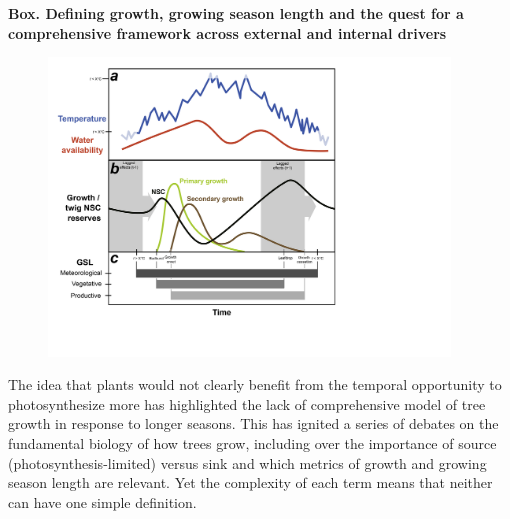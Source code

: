 \documentclass[11pt]{article}
\begin{document}
\newpage
{\bf Box. Defining growth, growing season length and the quest for a comprehensive framework across external and internal drivers}
\begin{figure}[h!]
\includegraphics[width=0.95\textwidth]{..//figures/gslconcept/NEW_FI~1_ac_ver2.png}
\label{fig:defineGSLgrowth}
\end{figure}

The idea that plants would not clearly benefit from the temporal opportunity to photosynthesize more has highlighted the lack of comprehensive model of tree growth in response to longer seasons. This has ignited a series of debates on the fundamental biology of how trees grow, including over the importance of source (photosynthesis-limited) versus sink \citep[plant-limited, but often via temperature, nutrient and other arguably external factors,][]{korner2015paradigm,friend2022wood} and which metrics of growth and growing season length are relevant. Yet the complexity of each term means that neither can have one simple definition. %
\end{document}
